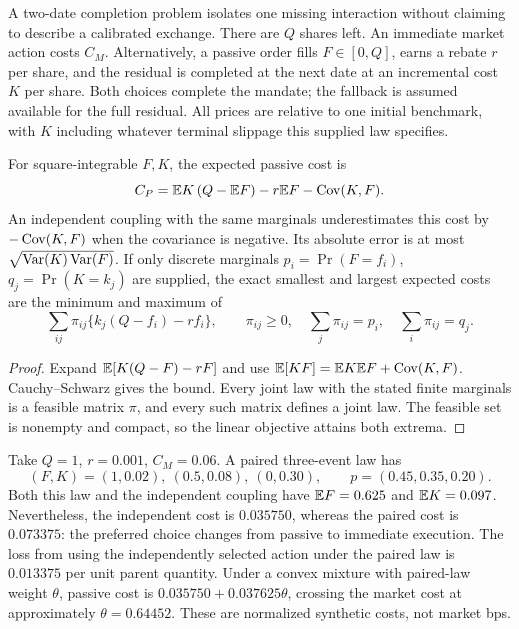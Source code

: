 A two-date completion problem isolates one missing interaction without
claiming to describe a calibrated exchange. There are \(Q\) shares left.
An immediate market action costs \(C_M\). Alternatively, a passive order
fills \(F\in[0,Q]\), earns a rebate \(r\) per share, and the residual is
completed at the next date at an incremental cost \(K\) per share. Both
choices complete the mandate; the fallback is assumed available for the
full residual. All prices are relative to one initial benchmark, with
\(K\) including whatever terminal slippage this supplied law specifies.

\begin{proposition}
\label{prop:completiondependence}
For square-integrable \(F,K\), the expected passive cost is
\begin{equation}\label{eq:completioncovariance}
 C_P=\mathbb{E} K\,(Q-\mathbb{E} F)-r\mathbb{E} F-\operatorname{Cov}(K,F).
\end{equation}
An independent coupling with the same marginals underestimates this cost
by \(-\operatorname{Cov}(K,F)\) when the covariance is negative. Its absolute error is
at most \(\sqrt{\operatorname{Var}(K)\operatorname{Var}(F)}\). If only discrete marginals
\(p_i=\Pr(F=f_i)\), \(q_j=\Pr(K=k_j)\) are supplied, the exact smallest
and largest expected costs are the minimum and maximum of
\begin{equation}\label{eq:completiontransport}
 \sum_{ij}\pi_{ij}\{k_j(Q-f_i)-rf_i\},\qquad
 \pi_{ij}\ge0,\quad \sum_j\pi_{ij}=p_i,\quad \sum_i\pi_{ij}=q_j.
\end{equation}
\end{proposition}
\begin{proof}
Expand \(\mathbb{E}[K(Q-F)-rF]\) and use
\(\mathbb{E}[KF]=\mathbb{E} K\mathbb{E} F+\operatorname{Cov}(K,F)\). Cauchy--Schwarz gives the bound.
Every joint law with the stated finite marginals is a feasible matrix
\(\pi\), and every such matrix defines a joint law. The feasible set is
nonempty and compact, so the linear objective attains both extrema.
\end{proof}

Take \(Q=1\), \(r=0.001\), \(C_M=0.06\). A paired three-event law has
\[
 (F,K)=(1,0.02),\ (0.5,0.08),\ (0,0.30),
 \qquad p=(0.45,0.35,0.20).
\]
Both this law and the independent coupling have
\(\mathbb{E} F=0.625\) and \(\mathbb{E} K=0.097\). Nevertheless, the independent cost is
\(0.035750\), whereas the paired cost is \(0.073375\): the preferred
choice changes from passive to immediate execution. The loss from using
the independently selected action under the paired law is \(0.013375\)
per unit parent quantity. Under a convex mixture with paired-law weight
\(\theta\), passive cost is
\(0.035750+0.037625\theta\), crossing the market cost at approximately
\(\theta=0.64452\). These are normalized synthetic costs, not market bps.

